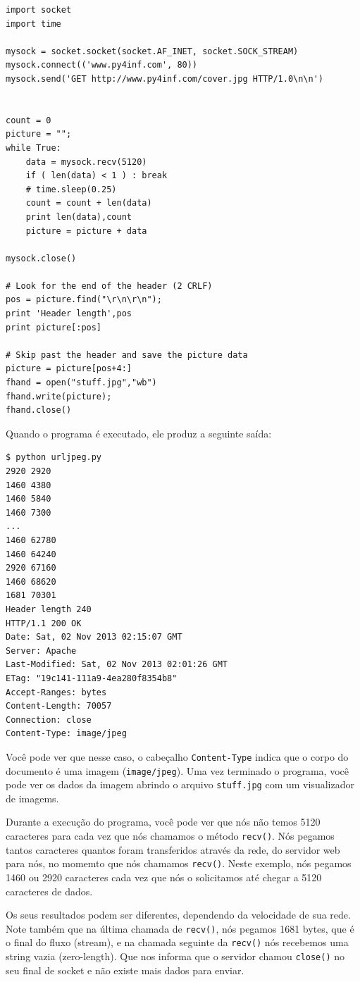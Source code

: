 \beforeverb
\begin{verbatim}
import socket
import time

mysock = socket.socket(socket.AF_INET, socket.SOCK_STREAM)
mysock.connect(('www.py4inf.com', 80))
mysock.send('GET http://www.py4inf.com/cover.jpg HTTP/1.0\n\n')


count = 0
picture = "";
while True:
    data = mysock.recv(5120)
    if ( len(data) < 1 ) : break
    # time.sleep(0.25)
    count = count + len(data)
    print len(data),count
    picture = picture + data

mysock.close()

# Look for the end of the header (2 CRLF)
pos = picture.find("\r\n\r\n");
print 'Header length',pos
print picture[:pos]

# Skip past the header and save the picture data
picture = picture[pos+4:]
fhand = open("stuff.jpg","wb")
fhand.write(picture);
fhand.close()
\end{verbatim}
\afterverb
%
Quando o programa é executado, ele produz a seguinte saída:

\beforeverb
\begin{verbatim}
$ python urljpeg.py 
2920 2920
1460 4380
1460 5840
1460 7300
...
1460 62780
1460 64240
2920 67160
1460 68620
1681 70301
Header length 240
HTTP/1.1 200 OK
Date: Sat, 02 Nov 2013 02:15:07 GMT
Server: Apache
Last-Modified: Sat, 02 Nov 2013 02:01:26 GMT
ETag: "19c141-111a9-4ea280f8354b8"
Accept-Ranges: bytes
Content-Length: 70057
Connection: close
Content-Type: image/jpeg
\end{verbatim}
\afterverb
%
Você pode ver que nesse caso, o cabeçalho 
{\tt Content-Type} indica que o corpo do
documento é uma imagem ({\tt image/jpeg}).
Uma vez terminado o programa, você pode ver os dados da imagem
abrindo o arquivo {\tt stuff.jpg} com um visualizador
de imagems.

Durante a execução do programa, você pode ver que nós não temos
5120 caracteres para cada vez que nós chamamos o método
{\tt recv()}. Nós pegamos tantos caracteres quantos foram
transferidos através da rede, do servidor web para nós, no momemto que
nós chamamos {\tt recv()}.  Neste exemplo, nós pegamos 1460 ou 2920 
caracteres cada vez que nós o solicitamos até chegar a 5120 caracteres
de dados.

Os seus resultados podem ser diferentes, dependendo da velocidade de
sua rede.  Note também que na última chamada de {\tt recv()}, nós pegamos
1681 bytes, que é o final do fluxo (stream), e na chamada seguinte da
{\tt recv()} nós recebemos uma string vazia (zero-length). Que nos informa
que o servidor chamou {\tt close()} no seu final de socket e não existe mais
dados para enviar.

